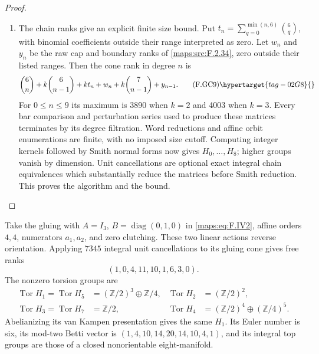\begin{proof}
\begin{enumerate}[label={$\langle1\rangle$\arabic*.}]
\item The chain ranks give an explicit finite size bound.  Put
$t_n=\sum_{q=0}^{\min(n,6)}\binom6q$, with binomial
coefficients outside their range interpreted as zero.
Let $w_n$ and $y_n$ be the raw cap and boundary ranks of
\ref{maps:src:F.2.34}, zero outside their listed ranges.  Then the cone rank
in degree $n$ is
\[
 \binom6n+k\binom6{n-1}+k t_n+w_n+
 k\binom7{n-1}+y_{n-1}.                                 \tag{F.GC9}\hypertarget{tag-02G8}{}\label{maps:eq:F.GC9}
\]
For $0\leq n\leq9$ its maximum is 3890 when $k=2$ and
4003 when $k=3$.  Every bar comparison and perturbation
series used to produce these matrices terminates by its
degree filtration.  Word reductions and affine orbit
enumerations are finite, with no imposed size cutoff.
Computing integer kernels followed by Smith normal forms
now gives $H_0,\ldots,H_8$; higher groups vanish by dimension.
Unit cancellations are optional exact integral chain
equivalences which substantially reduce the matrices before
Smith reduction.  This proves the algorithm and the bound.
\end{enumerate}
\end{proof}




\begin{remark}\label{rem:V:orientation-reversing-gluing}
Take the gluing with
$A=I_3$, $B=\operatorname{diag}(0,1,0)$ in \eqref{maps:eq:F.IV2},
affine orders $4,4$, numerators $a_1,a_2$, and zero
clutching.  These two linear actions reverse orientation.
Applying $7345$ integral unit cancellations to its gluing cone gives free ranks
\[
                  (1,0,4,11,10,1,6,3,0).
\]
The nonzero torsion groups are
\[
\begin{aligned}
 \operatorname{Tor}H_1=\operatorname{Tor}H_5
       &=(\mathbb Z/2)^3\oplus\mathbb Z/4,&
 \operatorname{Tor}H_2&=(\mathbb Z/2)^2,\\
 \operatorname{Tor}H_3=\operatorname{Tor}H_7
       &=\mathbb Z/2,&
 \operatorname{Tor}H_4&=(\mathbb Z/2)^4\oplus(\mathbb Z/4)^5.
\end{aligned}
\]
Abelianizing its van Kampen presentation gives the same $H_1$.  Its Euler number
is six, its mod-two Betti vector is
$(1,4,10,14,20,14,10,4,1)$, and its integral top groups
are those of a closed nonorientable eight-manifold.
\end{remark}










